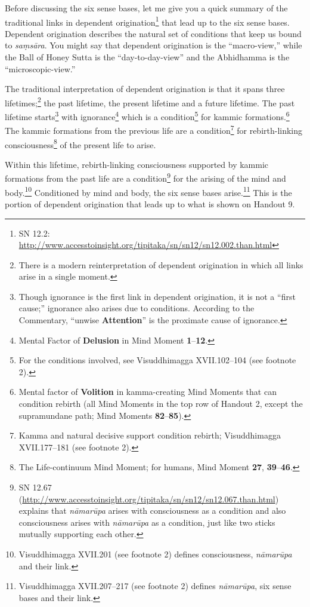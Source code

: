 Before discussing the six sense bases, let me give you a quick summary of the traditional links in dependent origination\footnote{SN 12.2: \url{http://www.accesstoinsight.org/tipitaka/sn/sn12/sn12.002.than.html}} that lead up to the six sense bases. Dependent origination describes the natural set of conditions that keep us bound to \textit{saṃsāra}. You might say that dependent origination is the “macro-view,” while the Ball of Honey Sutta is the “day-to-day-view” and the Abhidhamma is the “microscopic-view.”

The traditional interpretation of dependent origination is that it spans three lifetimes;\footnote{There is a modern reinterpretation of dependent origination in which all links arise in a single moment.} the past lifetime, the present lifetime and a future lifetime. The past lifetime starts\footnote{Though ignorance is the first link in dependent origination, it is not a “first cause;” ignorance also arises due to conditions. According to the Commentary, “unwise \textbf{Attention}” is the proximate cause of ignorance.} with ignorance\footnote{Mental Factor of \textbf{Delusion} in Mind Moment \textbf{1}--\textbf{12}.} which is a condition\footnote{For the conditions involved, see Visuddhimagga XVII.102--104 (see footnote 2).} for kammic formations.\footnote{Mental factor of \textbf{Volition} in kamma-creating Mind Moments that can condition rebirth (all Mind Moments in the top row of Handout 2, except the supramundane path; Mind Moments \textbf{82}--\textbf{85}).} The kammic formations from the previous life are a condition\footnote{Kamma and natural decisive support condition rebirth; Visuddhimagga XVII.177--181 (see footnote 2).} for rebirth-linking consciousness\footnote{The Life-continuum Mind Moment; for humans, Mind Moment \textbf{27}, \textbf{39}--\textbf{46}.} of the present life to arise.

Within this lifetime, rebirth-linking consciousness supported by kammic formations from the past life are a condition\footnote{SN 12.67 (\url{http://www.accesstoinsight.org/tipitaka/sn/sn12/sn12.067.than.html}) explains that \textit{nāmarūpa} arises with consciousness as a condition and also consciousness arises with \textit{nāmarūpa} as a condition, just like two sticks mutually supporting each other.} for the arising of the mind and body.\footnote{Visuddhimagga XVII.201 (see footnote 2) defines consciousness, \textit{nāmarūpa} and their link.} Conditioned by mind and body, the six sense bases arise.\footnote{Visuddhimagga XVII.207--217 (see footnote 2) defines \textit{nāmarūpa}, six sense bases and their link.} This is the portion of dependent origination that leads up to what is shown on Handout 9.

